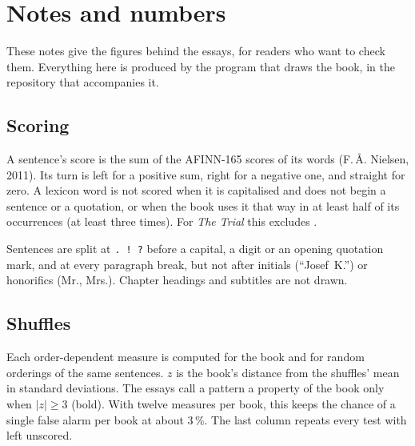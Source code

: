 \newcommand\zcell[1]{\ifnum\lab{sig-#1}=1 \textbf{\lab{z-#1}}\else\lab{z-#1}\fi}
\newcommand\rzcell[1]{\ifnum\lab{rsig-#1}=1 \textbf{\lab{rz-#1}}\else\lab{rz-#1}\fi}
\newcommand\vrow[2]{#2 & \lab{m-#1} & \lab{b-#1} $\pm$ \lab{sd-#1} & \zcell{#1} & \rzcell{#1}\\}
\newcommand\stripz[2]{%
  \begin{tikzpicture}
  \begin{axis}[width=40mm, height=21mm, ymin=0, axis y line=none,
      xmin=\lab{bmin-#1}, xmax=\lab{bmax-#1}, enlarge x limits=0.06, xtick=\empty,
      title={#2}, title style={font=\figfont\scriptsize, yshift=-1.5mm}, clip=false]
    \addplot[const plot mark mid, black, line width=0.4pt] table {../build/the-trial/baseline-#1.dat};
    \draw[line width=1.1pt] (axis cs:\lab{raw-#1},0) -- (axis cs:\lab{raw-#1},\pgfkeysvalueof{/pgfplots/ymax});
    \node[anchor=north, font=\figfont\scriptsize] at (axis cs:\lab{raw-#1},0) {$z=\lab{z-#1}$};
  \end{axis}
  \end{tikzpicture}}

\chapter{Notes and numbers}
\label{ch:notes}

These notes give the figures behind the essays, for readers who want to check
them. Everything here is produced by the program that draws the book, in the
repository that accompanies it.

\section{Scoring}
A sentence's score is the sum of the AFINN-165 scores of its words (F.\,Å.
Nielsen, 2011). Its turn is left for a positive sum, right for a negative one,
and straight for zero. A lexicon word is not scored when it is capitalised and
does not begin a sentence or a quotation, or when the book uses it that way in
at least half of its occurrences (at least three times). For \emph{The Trial}
this excludes .

Sentences are split at \texttt{. ! ?} before a capital, a digit or an opening
quotation mark, and at every paragraph break, but not after initials
(``Josef~K.'') or honorifics (Mr., Mrs.). Chapter headings and subtitles are
not drawn.

\section{Shuffles}
Each order-dependent measure is computed for the book and for 
random orderings of the same sentences. $z$ is the book's distance from the
shuffles' mean in standard deviations. The essays call a pattern a property of
the book only when $|z|\ge3$ (bold). With twelve measures per book, this keeps
the chance of a single false alarm per book at about 3\,\%. The last column
repeats every test with  left unscored.

